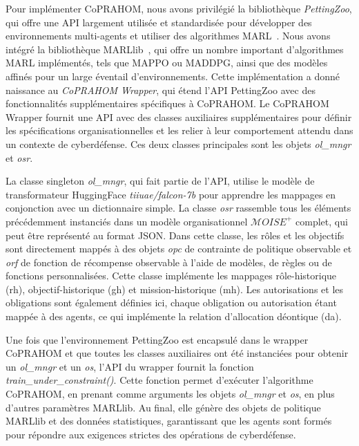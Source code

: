 Pour implémenter CoPRAHOM, nous avons privilégié la bibliothèque \emph{PettingZoo}, qui offre une API largement utilisée et standardisée pour développer des environnements multi-agents et utiliser des algorithmes MARL~\cite{terry2020pettingzoo}. Nous avons intégré la bibliothèque MARLlib~\cite{hu2022marllib}, qui offre un nombre important d'algorithmes MARL implémentés, tels que MAPPO ou MADDPG, ainsi que des modèles affinés pour un large éventail d'environnements. Cette implémentation a donné naissance au \textit{CoPRAHOM Wrapper}, qui étend l'API PettingZoo avec des fonctionnalités supplémentaires spécifiques à CoPRAHOM.
%
Le CoPRAHOM Wrapper fournit une API avec des classes auxiliaires supplémentaires pour définir les spécifications organisationnelles et les relier à leur comportement attendu dans un contexte de cyberdéfense. Ces deux classes principales sont les objets \textit{ol\_mngr} et \textit{osr}.

La classe singleton \textit{ol\_mngr}, qui fait partie de l'API, utilise le modèle de transformateur HuggingFace \textit{tiiuae/falcon-7b} pour apprendre les mappages en conjonction avec un dictionnaire simple.
La classe \textit{osr} rassemble tous les éléments précédemment instanciés dans un modèle organisationnel $\mathcal{M}OISE^+$ complet, qui peut être représenté au format JSON. Dans cette classe, les rôles et les objectifs sont directement mappés à des objets \textit{opc} de contrainte de politique observable et \textit{orf} de fonction de récompense observable à l'aide de modèles, de règles ou de fonctions personnalisées. Cette classe implémente les mappages rôle-historique (rh), objectif-historique (gh) et mission-historique (mh). Les autorisations et les obligations sont également définies ici, chaque obligation ou autorisation étant mappée à des agents, ce qui implémente la relation d'allocation déontique (da).

Une fois que l'environnement PettingZoo est encapsulé dans le wrapper CoPRAHOM et que toutes les classes auxiliaires ont été instanciées pour obtenir un \textit{ol\_mngr} et un \textit{os}, l'API du wrapper fournit la fonction \textit{train\_under\_constraint()}. Cette fonction permet d'exécuter l'algorithme CoPRAHOM, en prenant comme arguments les objets \textit{ol\_mngr} et \textit{os}, en plus d'autres paramètres MARLlib. Au final, elle génère des objets de politique MARLlib et des données statistiques, garantissant que les agents sont formés pour répondre aux exigences strictes des opérations de cyberdéfense.

